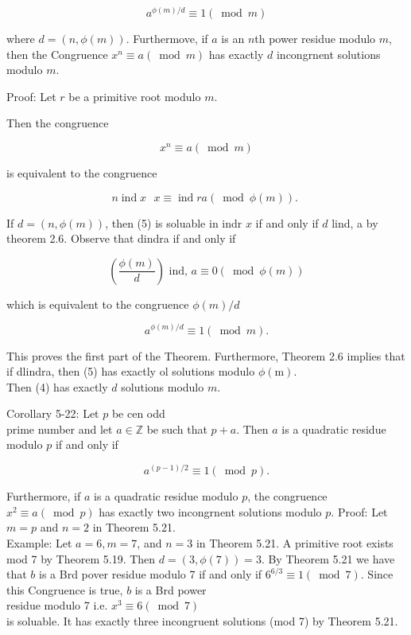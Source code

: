 \documentclass[10pt]{article}
\begin{document}
$$
a^{\phi(m) / d} \equiv 1(\bmod m)
$$

where $d=(n, \phi(m))$. Furthermove, if $a$ is an $n$th power residue modulo $m$, then the Congruence $x^{n} \equiv a(\bmod m)$ has exactly $d$ incongrnent solutions modulo $m$.

Proof: Let $r$ be a primitive root modulo $m$.

Then the congruence


\begin{equation*}
x^{n} \equiv a(\bmod m) \tag{4}
\end{equation*}


is equivalent to the congruence


\begin{equation*}
n \operatorname{ind} x \text { } x \equiv \operatorname{ind} r a(\bmod \phi(m)) \text {. } \tag{5}
\end{equation*}


If $d=(n, \phi(m))$, then (5) is soluable in indr $x$ if and only if $d$ lind, a by theorem 2.6. Observe that dindra if and only if

$$
\left(\frac{\phi(m)}{d}\right) \text { ind, } a \equiv 0(\bmod \phi(m))
$$

which is equivalent to the congruence $\phi(m) / d$

$$
a^{\phi(m) / d} \equiv 1(\bmod m) .
$$

This proves the first part of the Theorem. Furthermore, Theorem 2.6 implies that if dlindra, then (5) has exactly ol solutions modulo $\phi(\mathrm{m})$.\\
Then (4) has exactly $d$ solutions modulo $m$.

Corollary 5-22: Let $p$ be cen odd\\
prime number and let $a \in \mathbb{Z}$ be such that $p+a$. Then $a$ is a quadratic residue modulo $p$ if and only if

$$
a^{(p-1) / 2} \equiv 1(\bmod p) .
$$

Furthermore, if $a$ is a quadratic residue modulo $p$, the congruence $x^{2} \equiv a(\bmod p)$ has exactly two incongrnent solutions modulo $p$. Proof: Let $m=p$ and $n=2$ in Theorem 5.21.\\
Example: Let $a=6, m=7$, and $n=3$ in Theorem 5.21. A primitive root exists mod 7 by Theorem 5.19. Then $d=(3, \phi(7))=3$. By Theorem 5.21 we have that $b$ is a Brd pover residue modulo 7 if and only if $6^{6 / 3} \equiv 1(\bmod 7)$. Since this Congruence is true, $b$ is a Brd power\\
residue modulo 7 i.e. $x^{3} \equiv 6(\bmod 7)$\\
is soluable. It has exactly three incongruent solutions (mod 7) by Theorem 5.21.
\end{document}
